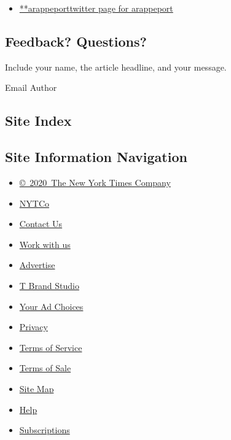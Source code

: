 \begin{itemize}
\tightlist
\item
  \href{https://twitter.com/arappeport}{**arappeporttwitter page for
  arappeport}
\end{itemize}

\hypertarget{feedback-questions}{%
\subsection{Feedback? Questions?}\label{feedback-questions}}

Include your name, the article headline, and your message.

Email Author

\hypertarget{site-index}{%
\subsection{Site Index}\label{site-index}}

\hypertarget{site-information-navigation}{%
\subsection{Site Information
Navigation}\label{site-information-navigation}}

\begin{itemize}
\tightlist
\item
  \href{https://help.nytimes3xbfgragh.onion/hc/en-us/articles/115014792127-Copyright-notice}{©~2020~The
  New York Times Company}
\end{itemize}

\begin{itemize}
\tightlist
\item
  \href{https://www.nytco.com/}{NYTCo}
\item
  \href{https://help.nytimes3xbfgragh.onion/hc/en-us/articles/115015385887-Contact-Us}{Contact
  Us}
\item
  \href{https://www.nytco.com/careers/}{Work with us}
\item
  \href{https://nytmediakit.com/}{Advertise}
\item
  \href{http://www.tbrandstudio.com/}{T Brand Studio}
\item
  \href{https://www.nytimes3xbfgragh.onion/privacy/cookie-policy\#how-do-i-manage-trackers}{Your
  Ad Choices}
\item
  \href{https://www.nytimes3xbfgragh.onion/privacy}{Privacy}
\item
  \href{https://help.nytimes3xbfgragh.onion/hc/en-us/articles/115014893428-Terms-of-service}{Terms
  of Service}
\item
  \href{https://help.nytimes3xbfgragh.onion/hc/en-us/articles/115014893968-Terms-of-sale}{Terms
  of Sale}
\item
  \href{https://spiderbites.nytimes3xbfgragh.onion}{Site Map}
\item
  \href{https://help.nytimes3xbfgragh.onion/hc/en-us}{Help}
\item
  \href{https://www.nytimes3xbfgragh.onion/subscription?campaignId=37WXW}{Subscriptions}
\end{itemize}
